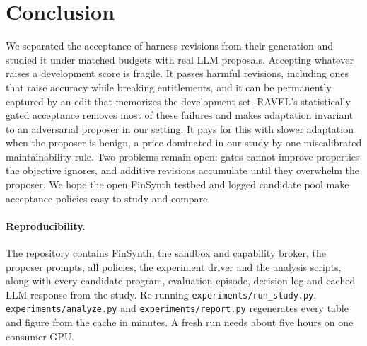 \section{Conclusion}
\label{sec:conclusion}
We separated the acceptance of harness revisions from their generation and studied it under matched
budgets with real LLM proposals. Accepting whatever raises a development score is fragile. It passes
harmful revisions, including ones that raise accuracy while breaking entitlements, and it can be
permanently captured by an edit that memorizes the development set. RAVEL's statistically gated acceptance
removes most of these failures and makes adaptation invariant to an adversarial proposer in our setting.
It pays for this with slower adaptation when the proposer is benign, a price dominated in our study by one
miscalibrated maintainability rule. Two problems remain open: gates cannot improve properties the
objective ignores, and additive revisions accumulate until they overwhelm the proposer. We hope the open
FinSynth testbed and logged candidate pool make acceptance policies easy to study and compare.

\paragraph{Reproducibility.} The repository contains FinSynth, the sandbox and capability broker, the
proposer prompts, all policies, the experiment driver and the analysis scripts, along with every
candidate program, evaluation episode, decision log and cached LLM response from the study. Re-running
\texttt{experiments/run\_study.py}, \texttt{experiments/analyze.py} and \texttt{experiments/report.py}
regenerates every table and figure from the cache in minutes. A fresh run needs about five hours on one
consumer GPU.
